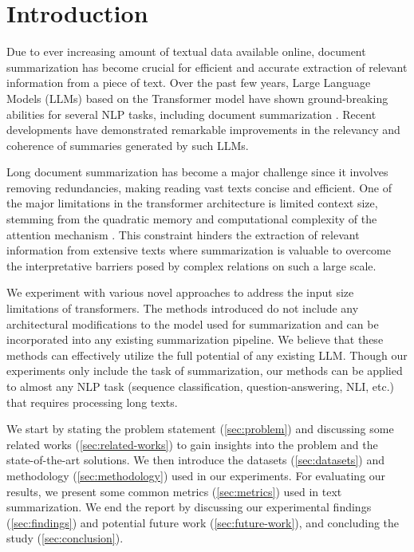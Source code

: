 \section{Introduction}
	\label{sec:introduction}

	Due to ever increasing amount of textual data available online, document summarization
	has become crucial for efficient and accurate extraction of relevant information from a
	piece of text.
	Over the past few years, Large Language Models (LLMs) based on the Transformer model
	\cite{vaswani2017attention} have shown ground-breaking abilities for several NLP tasks,
	including document summarization \cite{yadav2023state}.
	Recent developments have demonstrated remarkable improvements in the relevancy and
	coherence of summaries generated by such LLMs.

	Long document summarization has become a major challenge since it involves removing
	redundancies, making reading vast texts concise and efficient.
	One of the major limitations in the transformer architecture is limited context size,
	stemming from the quadratic memory and computational complexity of the attention mechanism
	\cite{du2023improving}.
	This constraint hinders the extraction of relevant information from extensive texts where
	summarization is valuable to overcome the interpretative barriers posed by complex relations
	on such a large scale.

	We experiment with various novel approaches to address the input size limitations of transformers.
	The methods introduced do not include any architectural modifications to the model used for
	summarization and can be incorporated into any existing summarization pipeline.
	We believe that these methods can effectively utilize the full potential of any existing LLM.
	Though our experiments only include the task of summarization, our methods can be applied
	to almost any NLP task (sequence classification, question-answering, NLI, etc.) that requires
	processing long texts.

	We start by stating the problem statement (\ref{sec:problem}) and discussing some related works
	(\ref{sec:related-works}) to gain insights into the problem and the state-of-the-art solutions.
	We then introduce the datasets (\ref{sec:datasets}) and methodology (\ref{sec:methodology}) used
	in our experiments.
	For evaluating our results, we present some common metrics (\ref{sec:metrics}) used in text
	summarization.
	We end the report by discussing our experimental findings (\ref{sec:findings}) and potential
	future work (\ref{sec:future-work}), and concluding the study (\ref{sec:conclusion}).
